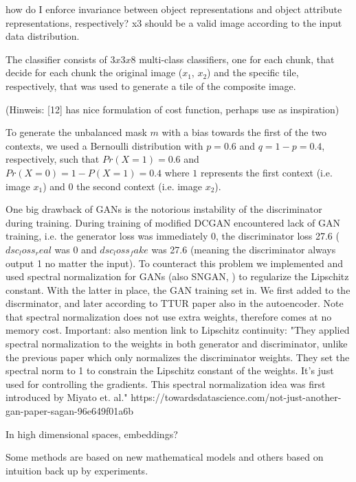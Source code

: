 \documentclass[12pt,a4paper]{article}
\begin{document}
how do I enforce invariance between object representations and object attribute representations, respectively?
x3 should be a valid image according to the input data distribution.

The classifier consists of $3x3x8$ multi-class classifiers, one for each chunk, that decide for each chunk the original image ($x_1$, $x_2$) and the specific tile, respectively, that was used to generate a tile of the composite image.

(Hinweis: [12] has nice formulation of cost function, perhaps use as inspiration)

\par To generate the unbalanced mask $m$ with a bias towards the first of the two contexts, we used a Bernoulli distribution with $p=0.6$ and $q=1-p=0.4$, respectively, such that $Pr(X=1)=0.6$ and $Pr(X=0)=1-P(X=1)=0.4$ where $1$ represents the first context (i.e. image $x_1$) and $0$ the second context (i.e. image $x_2$).

\par One big drawback of GANs is the notorious instability of the discriminator during training. During training of modified DCGAN encountered lack of GAN training, i.e. the generator loss was immediately 0, the discriminator loss 27.6 ($dsc_loss_real$ was 0 and $dsc_loss_fake$ was 27.6 (meaning the discriminator always output 1 no matter the input). To counteract this problem we implemented and used spectral normalization for GANs (also SNGAN, \cite{1802.05957}) to regularize the Lipschitz constant. With the latter in place, the GAN training set in. We first added to the discrminator, and later according to TTUR paper also in the autoencoder. Note that spectral normalization does not use extra weights, therefore comes at no memory cost.
Important: also mention link to Lipschitz continuity: "They applied spectral normalization to the weights in both generator and discriminator, unlike the previous paper which only normalizes the discriminator weights. They set the spectral norm to 1 to constrain the Lipschitz constant of the weights. It’s just used for controlling the gradients. This spectral normalization idea was first introduced by Miyato et. al." https://towardsdatascience.com/not-just-another-gan-paper-sagan-96e649f01a6b

\par In high dimensional spaces, embeddings?

\par Some methods are based on new mathematical models and others based on intuition back up by experiments.
\end{document}
